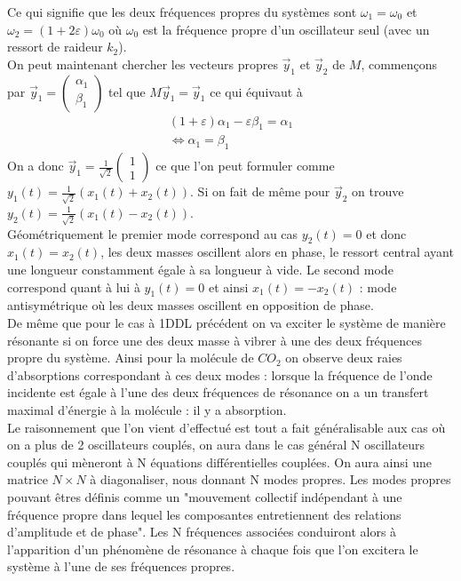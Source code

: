\documentclass[12pt,prb,aps,epsf]{article}
\begin{document}
Ce qui signifie que les deux fréquences propres du systèmes sont $\omega_1 = \omega_0$ et $\omega_2 = (1+2\varepsilon)\omega_0$ où $\omega_0$ est la fréquence propre d'un oscillateur seul (avec un ressort de raideur $k_2$).\\
On peut maintenant chercher les vecteurs propres $\vec{y}_1$ et $\vec{y}_2$ de $M$, commençons par $\vec{y}_1 = \begin{pmatrix}
\alpha_1\\ \beta_1
\end{pmatrix}$ tel que $M\vec{y}_1 = \vec{y}_1$ ce qui équivaut à
\begin{eqnarray}
(1+\varepsilon)\alpha_1 - \varepsilon \beta_1 = \alpha_1\\
\Leftrightarrow \alpha_1 = \beta_1
\end{eqnarray}
On a donc $\vec{y}_1 = \frac{1}{\sqrt{2}}\begin{pmatrix}
1\\ 1
\end{pmatrix}$ ce que l'on peut formuler comme $y_1(t) = \frac{1}{\sqrt{2}}(x_1(t) + x_2(t))$. Si on fait de même pour $\vec{y}_2$ on trouve $y_2(t) = \frac{1}{\sqrt{2}}(x_1(t) - x_2(t))$.\\ Géométriquement le premier mode correspond au cas $y_2(t)=0$ et donc $x_1(t) = x_2(t)$, les deux masses oscillent alors en phase, le ressort central ayant une longueur constamment égale à sa longueur à vide. Le second mode correspond quant à lui à $y_1(t) = 0$ et ainsi $x_1(t) = -x_2(t)$ : mode antisymétrique où les deux masses oscillent en opposition de phase.\\

De même que pour le cas à 1DDL précédent on va exciter le système de manière résonante si on force une des deux masse à vibrer à une des deux fréquences propre du système. Ainsi pour la molécule de $CO_2$ on observe deux raies d'absorptions correspondant à ces deux modes : lorsque la fréquence de l'onde incidente est égale à l'une des deux fréquences de résonance on a un transfert maximal d'énergie à la molécule : il y a absorption.\\ 

Le raisonnement que l'on vient d'effectué est tout a fait généralisable aux cas où on a plus de 2 oscillateurs couplés, on aura dans le cas général N oscillateurs couplés qui mèneront à N équations différentielles couplées. On aura ainsi une matrice $N\times N$ à diagonaliser, nous donnant N modes propres. Les modes propres pouvant êtres définis comme un "mouvement collectif indépendant à une fréquence propre dans lequel les composantes entretiennent des relations d'amplitude et de phase". Les N fréquences associées conduiront alors à l'apparition d'un phénomène de résonance à chaque fois que l'on excitera le système à l'une de ses fréquences propres.\\
\end{document}

